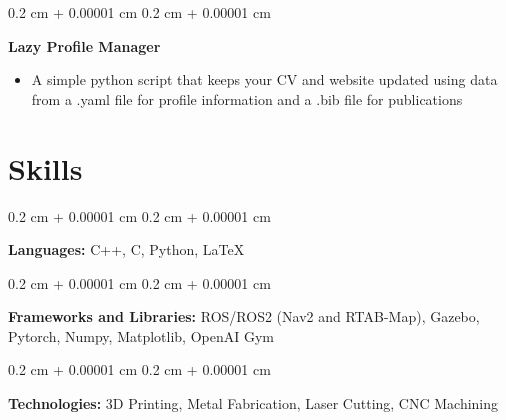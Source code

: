 \documentclass[10pt, a4paper]{article}
\newenvironment{highlights}{
    \begin{itemize}[
        topsep=0.10 cm,
        parsep=0.10 cm,
        partopsep=0pt,
        itemsep=0pt,
        leftmargin=0.4 cm + 10pt
    ]
}{
    \end{itemize}
} %
\newenvironment{onecolentry}{
    \begin{adjustwidth}{
        0.2 cm + 0.00001 cm
    }{
        0.2 cm + 0.00001 cm
    }
}{
    \end{adjustwidth}
} %
\begin{document}
        \vspace{0.2 cm}

        \begin{onecolentry}
            \textbf{Lazy Profile Manager}
            \begin{highlights}
                \item A simple python script that keeps your CV and website updated using data from a .yaml file for profile information and a .bib file for publications
            \end{highlights}
        \end{onecolentry}



    
    \section{Skills}



        
        \begin{onecolentry}
            \textbf{Languages:} C++, C, Python, LaTeX
        \end{onecolentry}

        \vspace{0.2 cm}

        \begin{onecolentry}
            \textbf{Frameworks and Libraries:} ROS/ROS2 (Nav2 and RTAB-Map), Gazebo, Pytorch, Numpy, Matplotlib, OpenAI Gym
        \end{onecolentry}

        \vspace{0.2 cm}

        \begin{onecolentry}
            \textbf{Technologies:} 3D Printing, Metal Fabrication, Laser Cutting, CNC Machining
        \end{onecolentry}


    
\end{document}
